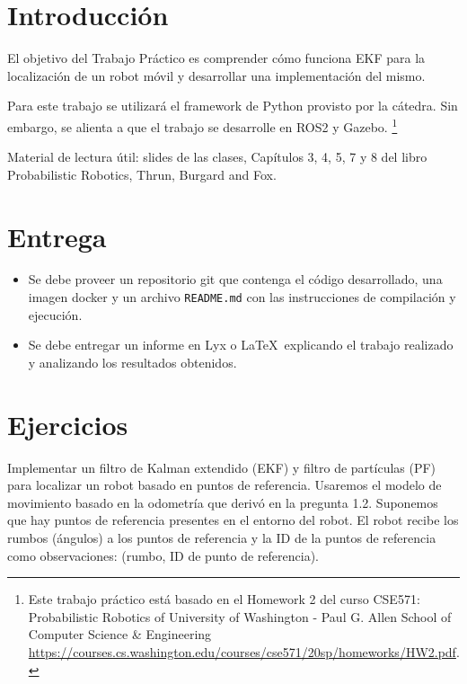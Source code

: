 \documentclass[tp]{lcc}
\begin{document}
	\maketitle
	
	
	\section{Introducción}
	
	El objetivo del Trabajo Práctico es comprender cómo funciona EKF para la localización de un robot móvil y desarrollar una implementación del mismo.
	
	Para este trabajo se utilizará el framework de Python provisto por la cátedra. Sin embargo, se alienta a que el trabajo se desarrolle en ROS2 y Gazebo. \footnote{Este trabajo práctico está basado en el Homework 2 del curso CSE571: Probabilistic Robotics of University of Washington - Paul G. Allen School of Computer Science \& Engineering \url{https://courses.cs.washington.edu/courses/cse571/20sp/homeworks/HW2.pdf}.}
	
	Material de lectura útil: slides de las clases, Capítulos 3, 4, 5, 7 y 8 del libro Probabilistic Robotics, Thrun, Burgard and Fox.
	
	
	\section{Entrega}
	\begin{itemize}
		\item Se debe proveer un repositorio git que contenga el código desarrollado, una imagen docker y un archivo \lstinline{README.md} con las instrucciones de compilación y ejecución.
		
		\item Se debe entregar un informe en Lyx o \LaTeX\  explicando el trabajo realizado y analizando los resultados obtenidos.
	\end{itemize}

	
	\section{Ejercicios}
	
	
	Implementar un filtro de Kalman extendido (EKF) y filtro de partículas (PF) para localizar un robot basado en puntos de referencia. Usaremos el modelo de movimiento basado en la odometría que derivó en la pregunta 1.2. Suponemos que hay puntos de referencia presentes en el entorno del robot. El robot recibe los rumbos (ángulos) a los puntos de referencia y la ID de la puntos de referencia como observaciones: (rumbo, ID de punto de referencia).
	
\end{document}
